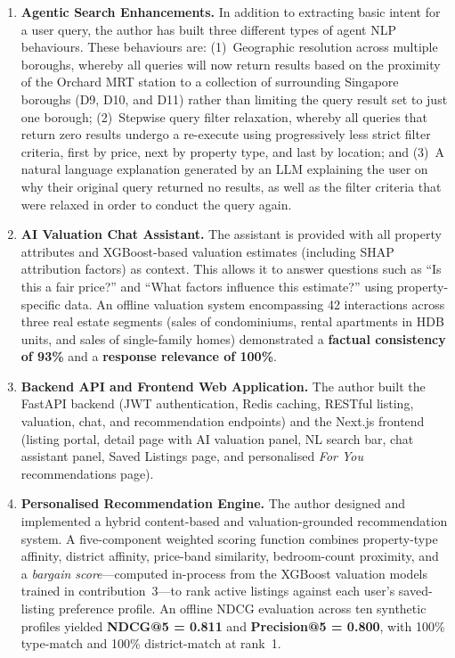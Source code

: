 \begin{enumerate}
    \item \textbf{Agentic Search Enhancements.}
    In addition to extracting basic intent for a user query, the author has built 
    three different types of agent NLP behaviours. These behaviours are: 
    (1)~Geographic resolution across multiple boroughs, whereby all queries will 
    now return results based on the proximity of the Orchard MRT station to a 
    collection of surrounding Singapore boroughs (D9, D10, and D11) rather than 
    limiting the query result set to just one borough; (2)~Stepwise query filter 
    relaxation, whereby all queries that return zero results undergo a re-execute 
    using progressively less strict filter criteria, first by price, next by 
    property type, and last by location; and (3)~A natural language explanation 
    generated by an LLM explaining the user on why their original query returned 
    no results, as well as the filter criteria that were relaxed in order to 
    conduct the query again.

    \item \textbf{AI Valuation Chat Assistant.}
    The assistant is provided with all property attributes and XGBoost-based valuation 
    estimates (including SHAP attribution factors) as context. This allows it to 
    answer questions such as ``Is this a fair price?'' and ``What factors influence 
    this estimate?'' using property-specific data. An offline valuation system 
    encompassing 42 interactions across three real estate segments (sales of 
    condominiums, rental apartments in HDB units, and sales of single-family homes) 
    demonstrated a \textbf{factual consistency of 93\%} and a \textbf{response 
    relevance of 100\%}.

    \item \textbf{Backend API and Frontend Web Application.}
    The author built the FastAPI backend (JWT authentication, Redis caching, RESTful listing,
    valuation, chat, and recommendation endpoints) and the Next.js frontend (listing portal,
    detail page with AI valuation panel, NL search bar, chat assistant panel, Saved Listings
    page, and personalised \emph{For You} recommendations page).

    \item \textbf{Personalised Recommendation Engine.}
    The author designed and implemented a hybrid content-based and valuation-grounded
    recommendation system. A five-component weighted scoring function combines property-type
    affinity, district affinity, price-band similarity, bedroom-count proximity, and a
    \emph{bargain score}---computed in-process from the XGBoost valuation models trained in
    contribution~3---to rank active listings against each user's saved-listing preference
    profile. An offline NDCG evaluation across ten synthetic profiles yielded
    \textbf{NDCG@5 = 0.811} and \textbf{Precision@5 = 0.800}, with 100\% type-match and
    100\% district-match at rank~1.
\end{enumerate}

